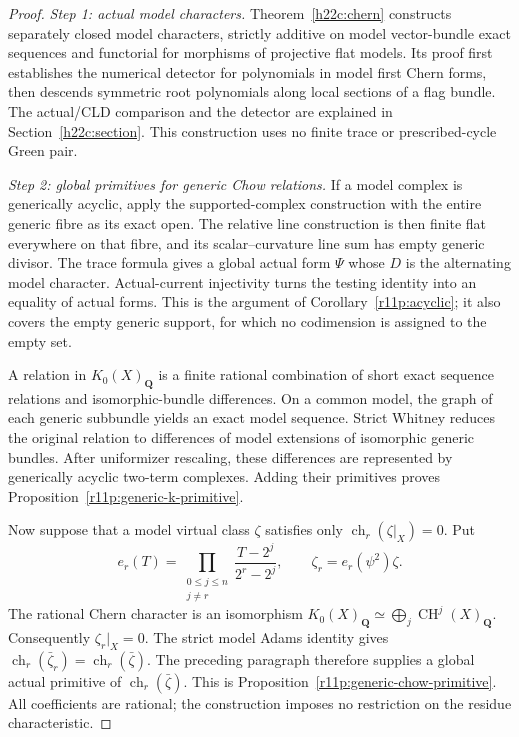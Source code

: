 \documentclass[11pt,a4paper]{article}
\theoremstyle{definition}
\theoremstyle{remark}
\begin{document}
\begin{proof}
\textit{Step 1: actual model characters.}
Theorem~\ref{h22c:chern} constructs separately closed model characters,
strictly additive on model vector-bundle exact sequences and functorial
for morphisms of projective flat models. Its proof first establishes
the numerical detector for polynomials in model first Chern forms,
then descends symmetric root polynomials along local sections of a
flag bundle. The actual/CLD comparison and the detector are explained
in Section~\ref{h22c:section}. This construction uses no
finite trace or prescribed-cycle Green pair.

\textit{Step 2: global primitives for generic Chow relations.}
If a model complex is generically acyclic, apply the supported-complex
construction with the entire generic fibre as its exact open. The
relative line construction is then finite flat everywhere on that
fibre, and its scalar--curvature line sum has empty generic divisor.
The trace formula gives a global actual form $\Psi$ whose $D$ is the
alternating model character. Actual-current injectivity turns the
testing identity into an equality of actual forms. This is the
argument of Corollary~\ref{r11p:acyclic}; it also covers the empty
generic support, for which no codimension is assigned to the empty set.

A relation in $K_0(X)_{\mathbf Q}$ is a finite rational combination of
short exact sequence relations and isomorphic-bundle differences.
On a common model, the graph of each generic subbundle yields an exact
model sequence. Strict Whitney reduces the original relation to
differences of model extensions of isomorphic generic bundles.
After uniformizer rescaling, these differences are represented by
generically acyclic two-term complexes. Adding their primitives proves
Proposition~\ref{r11p:generic-k-primitive}.

Now suppose that a model virtual class $\zeta$ satisfies only
$\operatorname{ch}_r(\zeta|_X)=0$. Put
\[
 e_r(T)=\prod_{\substack{0\le j\le n\\j\ne r}}
                  \frac{T-2^j}{2^r-2^j},\qquad
                         \zeta_r=e_r(\psi^2)\zeta.
\]
The rational Chern character is an isomorphism
$K_0(X)_{\mathbf Q}\simeq\bigoplus_j\operatorname{CH}^j(X)_{\mathbf Q}$.
Consequently $\zeta_r|_X=0$. The strict model Adams identity gives
$\operatorname{ch}_r(\bar\zeta_r)=\operatorname{ch}_r(\bar\zeta)$.
The preceding paragraph therefore supplies a global actual primitive
of $\operatorname{ch}_r(\bar\zeta)$. This is
Proposition~\ref{r11p:generic-chow-primitive}. All coefficients are
rational; the construction imposes no restriction on the residue
characteristic.


\end{proof}
\end{document}
